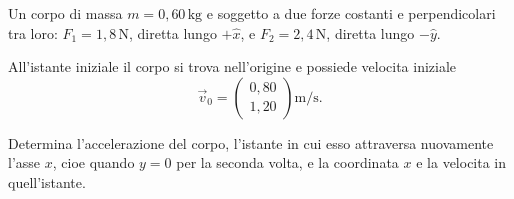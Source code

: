 
\begin{esercizio}
Un corpo di massa \(m = 0{,}60\,\mathrm{kg}\) e soggetto a due forze costanti
e perpendicolari tra loro: \(F_1 = 1{,}8\,\mathrm{N}\), diretta lungo
\(+\hat x\), e \(F_2 = 2{,}4\,\mathrm{N}\), diretta lungo \(-\hat y\).

All'istante iniziale il corpo si trova nell'origine e possiede velocita
iniziale
\[
\vec v_0 =
\begin{pmatrix}
0{,}80 \\[4pt]
1{,}20
\end{pmatrix}
\mathrm{m/s}.
\]

Determina l'accelerazione del corpo, l'istante in cui esso attraversa
nuovamente l'asse \(x\), cioe quando \(y=0\) per la seconda volta, e la
coordinata \(x\) e la velocita in quell'istante.
\end{esercizio}

